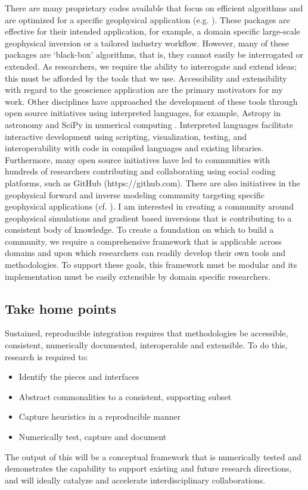 \documentclass[11pt]{article}
\begin{document}
There are many proprietary codes available that focus on efficient algorithms and are optimized for a specific geophysical application (e.g. \citep{Kelbert2014a, Key2007, liol96, Li1998a}). These packages are effective for their intended application, for example, a domain specific large-scale geophysical inversion or a tailored industry workflow. However, many of these packages are `black-box' algorithms, that is, they cannot easily be interrogated or extended. As researchers, we require the ability to interrogate and extend ideas; this must be afforded by the tools that we use. Accessibility and extensibility with regard to the geoscience application are the primary motivators for my work. Other disciplines have approached the development of these tools through open source initiatives using interpreted languages, for example, Astropy in astronomy \citep{Astropy} and SciPy in numerical computing \citep{scipy}. Interpreted languages facilitate interactive development using scripting, visualization, testing, and interoperability with code in compiled languages and existing libraries. Furthermore, many open source initiatives have led to communities with hundreds of researchers contributing and collaborating using social coding platforms, such as GitHub (https://github.com). There are also initiatives in the geophysical forward and inverse modeling community targeting specific geophysical applications (cf. \citep{Hansen2013, PySIT2013, Uieda2014, Kelbert2014a, Modflow}). I am interested in creating a community around geophysical simulations and gradient based inversions that is contributing to a consistent body of knowledge. To create a foundation on which to build a community, we require a comprehensive framework that is applicable across domains and upon which researchers can readily develop their own tools and methodologies. To support these goals, this framework must be modular and its implementation must be easily extensible by domain specific researchers.

\subsection{Take home points}
Sustained, reproducible integration requires that methodologies be accessible, consistent, numerically documented, interoperable and extensible. To do this, research is required to:
\begin{itemize}
    \item Identify the pieces and interfaces
    \item Abstract commonalities to a consistent, supporting subset
    \item Capture heuristics in a reproducible manner
    \item Numerically test, capture and document
\end{itemize}
The output of this will be a conceptual framework that is numerically tested and demonstrates the capability to support existing and future research directions, and will ideally catalyze and accelerate interdisciplinary collaborations.
\end{document}
